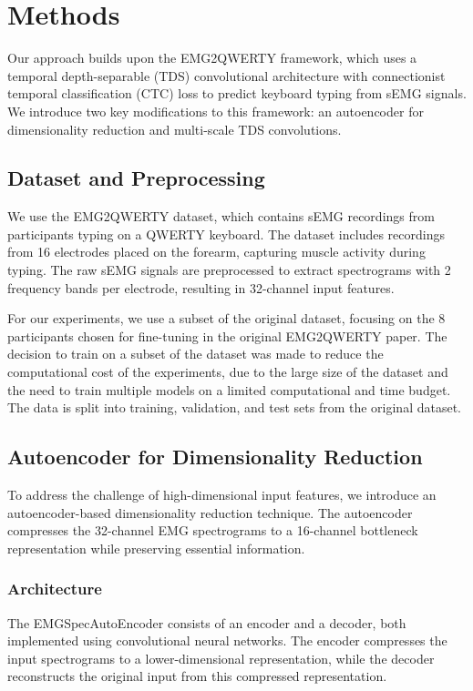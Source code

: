 \section{Methods}

Our approach builds upon the EMG2QWERTY framework, which uses a temporal depth-separable (TDS) convolutional architecture with connectionist temporal classification (CTC) loss to predict keyboard typing from sEMG signals. We introduce two key modifications to this framework: an autoencoder for dimensionality reduction and multi-scale TDS convolutions.

\subsection{Dataset and Preprocessing}

We use the EMG2QWERTY dataset, which contains sEMG recordings from participants typing on a QWERTY keyboard. The dataset includes recordings from 16 electrodes placed on the forearm, capturing muscle activity during typing. The raw sEMG signals are preprocessed to extract spectrograms with 2 frequency bands per electrode, resulting in 32-channel input features.

For our experiments, we use a subset of the original dataset, focusing on the 8 participants chosen for fine-tuning in the original EMG2QWERTY paper. The decision to train on a subset of the dataset was made to reduce the computational cost of the experiments, due to the large size of the dataset and the need to train multiple models on a limited computational and time budget. The data is split into training, validation, and test sets from the original dataset.

\subsection{Autoencoder for Dimensionality Reduction}

To address the challenge of high-dimensional input features, we introduce an autoencoder-based dimensionality reduction technique. The autoencoder compresses the 32-channel EMG spectrograms to a 16-channel bottleneck representation while preserving essential information.

\subsubsection{Architecture}

The EMGSpecAutoEncoder consists of an encoder and a decoder, both implemented using convolutional neural networks. The encoder compresses the input spectrograms to a lower-dimensional representation, while the decoder reconstructs the original input from this compressed representation.

